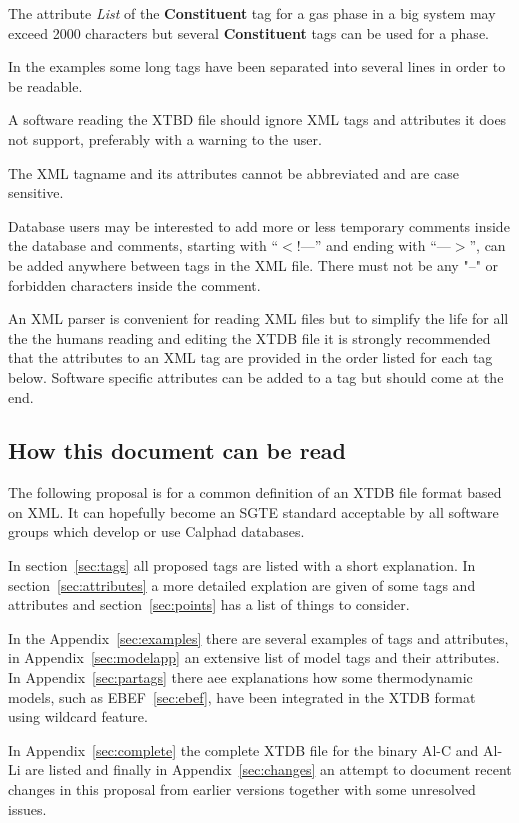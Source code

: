 \documentclass{article}
\begin{document}
The attribute {\em List} of the {\bf Constituent} tag for a gas phase
in a big system may exceed 2000 characters but several {\bf
  Constituent} tags can be used for a phase.

In the examples some long tags have been separated into several lines
in order to be readable.

A software reading the XTBD file should ignore XML tags and attributes
it does not support, preferably with a warning to the user.

The XML tagname and its attributes cannot be abbreviated and are case
sensitive.

Database users may be interested to add more or less temporary
comments inside the database and comments, starting with ``$<$!---''
and ending with ``---$>$'', can be added anywhere between tags in the
XML file.  There must not be any "--" or forbidden characters inside
the comment.

An XML parser is convenient for reading XML files but to simplify the
life for all the the humans reading and editing the XTDB file it is
strongly recommended that the attributes to an XML tag are provided in
the order listed for each tag below.  Software specific attributes can
be added to a tag but should come at the end.

\subsection{How this document can be read}

The following proposal is for a common definition of an XTDB file
format based on XML.  It can hopefully become an SGTE standard
acceptable by all software groups which develop or use Calphad
databases.

In section~\ref{sec:tags} all proposed tags are listed with a short
explanation.  In section~\ref{sec:attributes} a more detailed
explation are given of some tags and attributes and
section~\ref{sec:points} has a list of things to consider.

In the Appendix~\ref{sec:examples} there are several examples of tags
and attributes, in Appendix~\ref{sec:modelapp} an extensive list of
model tags and their attributes.  In Appendix~\ref{sec:partags} there
aee explanations how some thermodynamic models, such as
EBEF~\ref{sec:ebef}, have been integrated in the XTDB format using
wildcard feature.

In Appendix~\ref{sec:complete} the complete XTDB file for the binary
Al-C and Al-Li are listed and finally in Appendix~\ref{sec:changes} an
attempt to document recent changes in this proposal from earlier
versions together with some unresolved issues.
\end{document}
